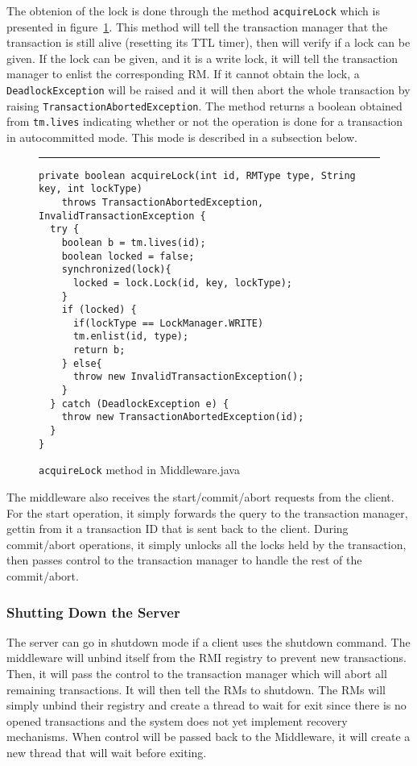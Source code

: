 \documentclass[12pt]{article}
\theoremstyle{plain}%
\theoremstyle{definition}
\theoremstyle{remark}
\newcommand{\java}[1]{{\lstinline!#1!}}
\newenvironment{figureone}[1]{%
  \def\deffigurecaption{#1}%
  \begin{figure}[htbp]%
  \begin{center}%
  \begin{minipage}{\columnwidth}%
  \hrule \vspace*{2ex}%
}{%
  \end{minipage}%
  \end{center}%
  \caption{\deffigurecaption}%
  \end{figure}%
}
\begin{document}
The obtenion of the lock is done through the method \java{acquireLock} which is presented in figure~\ref{fig:acquireLock}. This method will tell the transaction manager that the transaction is still alive (resetting its TTL timer), then will verify if a lock can be given. If the lock can be given, and it is a write lock, it will tell the transaction manager to enlist the corresponding RM. If it cannot obtain the lock, a \java{DeadlockException} will be raised and it will then abort the whole transaction by raising \java{TransactionAbortedException}. The method returns a boolean obtained from \java{tm.lives} indicating whether or not the operation is done for a transaction in autocommitted mode. This mode is described in a subsection below.

\begin{figureone}{\java{acquireLock} method in Middleware.java \label{fig:acquireLock}}
\begin{lstlisting}
private boolean acquireLock(int id, RMType type, String key, int lockType) 
    throws TransactionAbortedException, InvalidTransactionException {
  try {
    boolean b = tm.lives(id);
    boolean locked = false;
    synchronized(lock){
      locked = lock.Lock(id, key, lockType);
    }
    if (locked) {
      if(lockType == LockManager.WRITE)
      tm.enlist(id, type);
      return b;
    } else{
      throw new InvalidTransactionException();
    }
  } catch (DeadlockException e) {
    throw new TransactionAbortedException(id);
  }
}
\end{lstlisting}
\end{figureone}

The middleware also receives the start/commit/abort requests from the client. For the start operation, it simply forwards the query to the transaction manager, gettin from it a transaction ID that is sent back to the client. During commit/abort operations, it simply unlocks all the locks held by the transaction, then passes control to the transaction manager to handle the rest of the commit/abort.

\subsubsection*{Shutting Down the Server}

The server can go in shutdown mode if a client uses the shutdown command. The middleware will unbind itself from the RMI registry to prevent new transactions. Then, it will pass the control to the transaction manager which will abort all remaining transactions. It will then tell the RMs to shutdown. The RMs will simply unbind their registry and create a thread to wait for exit since there is no opened transactions and the system does not yet implement recovery mechanisms. When control will be passed back to the Middleware, it will create a new thread that will wait before exiting.
\end{document}
